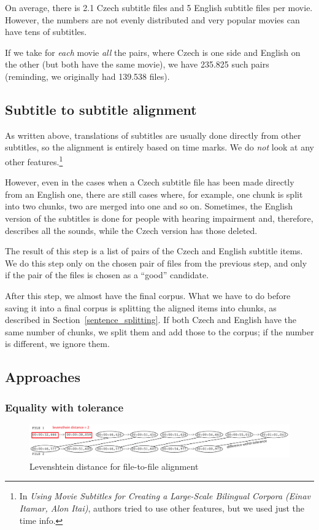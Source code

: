 On average, there is 2.1 Czech subtitle files and 5 English subtitle files per movie. However, the numbers are not evenly distributed and very popular movies can have tens of subtitles.

If we take for \emph{each} movie \emph{all} the pairs, where Czech is one side and English on the other (but both have the same movie), we have 235.825 such pairs (reminding, we originally had 139.538 files).

\subsection{Subtitle to subtitle alignment}
As written above, translations of subtitles are usually done directly from other subtitles, so the alignment is entirely based on time marks. We do \emph{not} look at any other features.\footnote{In \emph{Using Movie Subtitles for Creating a Large-Scale Bilingual Corpora (Einav Itamar, Alon Itai)}, authors tried to use other features, but we used just the time info.}

However, even in the cases when a Czech subtitle file has been made directly from an English one, there are still cases where, for example, one chunk is split into two chunks, two are merged into one and so on. Sometimes, the English version of the subtitles is done for people with hearing impairment and, therefore, describes all the sounds, while the Czech version has those deleted.

The result of this step is a list of pairs of the Czech and English subtitle items. We do this step only on the chosen pair of files from the previous step, and only if the pair of the files is chosen as a ``good'' candidate.

After this step, we almost have the final corpus. What we have to do before saving it into a final corpus is splitting the aligned items into chunks, as described in Section~\ref{sentence_splitting}. If both Czech and English have the same number of chunks, we split them and add those to the corpus; if the number is different, we ignore them.


\subsection{Approaches}
\subsubsection{Equality with tolerance}

\begin{figure}[t]
\begin{center}
\includegraphics[width=\textwidth]{figures/tolerance_priklad.pdf}
\end{center}
\caption{Levenshtein distance for file-to-file alignment}\label{tolerance}
\end{figure}

